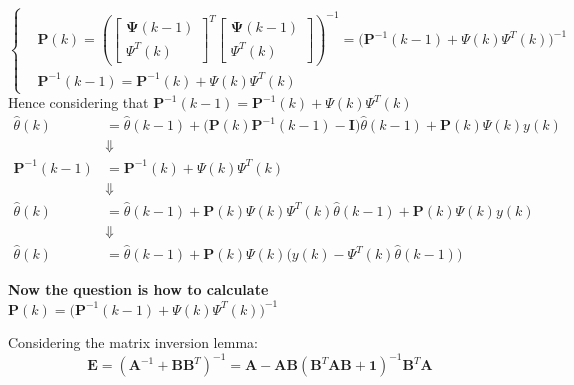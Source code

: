 \documentclass[11pt,a4paper,oneside]{book}
\numberwithin{equation}{section}
\theoremstyle{it}
\theoremstyle{definition}
\begin{document}
\begin{equation}
	\left\{
	\begin{aligned}
		& \mathbf{P}(k) = \left(\begin{bmatrix} \mathbf{\Psi}(k-1) \\[6pt] 
		\Psi^T(k) \end{bmatrix}^T \begin{bmatrix} \mathbf{\Psi}(k-1) \\[6pt] 
		\Psi^T(k) \end{bmatrix} \right)^{-1} = 
		\Big(\mathbf{P}^{-1}(k-1)+\Psi(k)\Psi^T(k)\Big)^{-1}\\[6pt]
		& \mathbf{P}^{-1}(k-1) = \mathbf{P}^{-1}(k)+\Psi(k)\Psi^T(k)
	\end{aligned}\right.
\end{equation}
Hence considering that 
$\mathbf{P}^{-1}(k-1)=\mathbf{P}^{-1}(k)+\Psi(k)\Psi^T(k)$
\begin{equation*}
	\begin{aligned}
		\hat{\theta}(k) &= 
		\hat{\theta}(k-1)+\Big(\mathbf{P}(k)\mathbf{P}^{-1}(k-1)-\mathbf{I}\Big)\hat{\theta}(k-1)+\mathbf{P}(k)\Psi(k)y(k)
		 \\[6pt]
		& \Downarrow \\[6pt]
		\mathbf{P}^{-1}(k-1) &= \mathbf{P}^{-1}(k)+\Psi(k)\Psi^T(k) \\[6pt]
		& \Downarrow \\[6pt]
		\hat{\theta}(k) &= 
		\hat{\theta}(k-1)+\mathbf{P}(k)\Psi(k)\Psi^T(k)\hat{\theta}(k-1)+\mathbf{P}(k)\Psi(k)y(k)
		 \\[6pt]
		& \Downarrow \\[6pt]
		\hat{\theta}(k) &= \hat{\theta}(k-1)+\mathbf{P}(k)\Psi(k)\Big(y(k) 
		-\Psi^T(k)\hat{\theta}(k-1)\Big) 
	\end{aligned}
\end{equation*}

\noindent\textbf{Now the question is how to calculate} 
$\mathbf{P}(k)=\Big(\mathbf{P}^{-1}(k-1)+\Psi(k)\Psi^T(k)\Big)^{-1} $

Considering the matrix inversion lemma: 
\begin{equation}
	\mathbf{E}=\left( 
	\mathbf{A}^{-1}+\mathbf{B}\mathbf{B}^T\right)^{-1}=\mathbf{A}-\mathbf{A}\mathbf{B}\left(\mathbf{B}^T\mathbf{A}\mathbf{B}+
	 \mathbf{1}\right)^{-1}\mathbf{B}^T\mathbf{A}
\end{equation}
\end{document}
